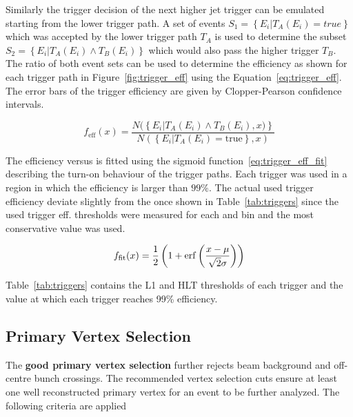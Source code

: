 Similarly the trigger decision of the next higher jet trigger can be emulated
starting from the lower trigger path. A set of events $S_1 = \left\{E_i | T_A
(E_i) = true \right\}$ which was accepted  by the lower trigger path $T_A$ is
used to determine the subset $S_2 = \left\{E_i|T_A(E_i) \wedge  T_B(E_i)
\right\}$ which would also pass the higher trigger $T_B$. The ratio of both
event sets can be used to determine the efficiency as shown for each trigger
path in Figure~\ref{fig:trigger_eff} using the Equation~\ref{eq:trigger_eff}.
The error bars of the trigger efficiency are given by Clopper-Pearson confidence
intervals.

\begin{equation}
\label{eq:trigger_eff}
    f_{\mathrm{eff}} (x) = \frac{N(\left\{E_i|T_A(E_i) \wedge T_B(E_i), x)\right\}}{N(\left\{ E_i | T_A(E_i) = \mathrm{true} \right\} , x)}
\end{equation}

The efficiency versus \ptavg is fitted using the sigmoid function~\ref{eq:trigger_eff_fit} describing
the turn-on behaviour of the trigger paths. Each trigger was used in a region in which the efficiency
is larger than $99\%$. The actual used trigger efficiency deviate slightly from the once shown in Table~\ref{tab:triggers}
since the used trigger eff. thresholds were measured for each \ystar and \yboost bin and the most
conservative value was used.

\begin{equation}
\label{eq:trigger_eff_fit}
    f_{\mathrm{fit}} (x) = \frac{1}{2} \left( 1 + \operatorname{erf} \left(\frac{x-\mu}{\sqrt{2}\sigma}\right)\right)
\end{equation}

Table~\ref{tab:triggers} contains the L1 and HLT thresholds of each trigger and
the \ptavg value at which each trigger reaches 99\% efficiency.

\subsection{Primary Vertex Selection}

The \textbf{good primary vertex selection} further rejects beam background and off-centre bunch
crossings. The recommended vertex selection cuts ensure at least one well
reconstructed primary vertex for an event to be further analyzed. The following
criteria are applied 

